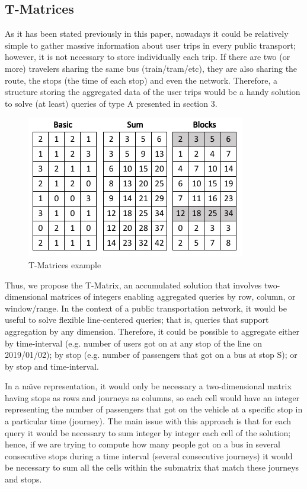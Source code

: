     \subsection{T-Matrices}
    As it has been stated previously in this paper, nowadays it could be relatively simple to gather massive information about user trips in every public transport; however, it is not necessary to store individually each trip. If there are two (or more) travelers sharing the same bus (train/tram/etc), they are also sharing the route, the stops (the time of each stop) and even the network. Therefore, a structure storing the aggregated data of the user trips would be a handy solution to solve (at least) queries of type A presented in section 3.

    \begin{figure}[ht]
    \begin{center}
      \includegraphics[scale=0.8]{figures/Tmatrices.png}
      \caption{T-Matrices example}
      \label{fig:tmatrix}
    \end{center}
    \end{figure}
    
    Thus, we propose the T-Matrix, an accumulated solution that involves two-dimensional matrices of integers enabling aggregated queries by row, column, or window/range. In the context of a public transportation network, it would be useful to solve flexible line-centered queries; that is, queries that support aggregation by any dimension. Therefore, it could be possible to aggregate either by time-interval (e.g. number of users got on at any stop of the line on 2019/01/02); by stop (e.g. number of passengers that got on a bus at stop S); or by stop and time-interval.
    
    In a na\"{\i}ve representation, it would only be necessary a two-dimensional matrix having stops as rows and journeys as columns, so each cell would have an integer representing the number of passengers that got on the vehicle at a specific stop in a particular time (journey). The main issue with this approach is that for each query it would be necessary to sum integer by integer each cell of the solution; hence, if we are trying to compute how many people got on a bus in several consecutive stops during a time interval (several consecutive journeys) it would be necessary to sum all the cells within the submatrix that match these journeys and stops.
    
